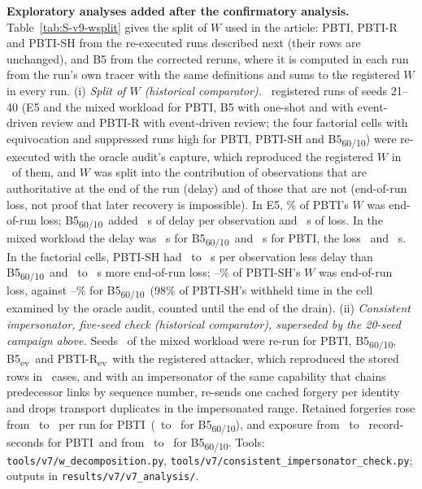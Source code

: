 \documentclass[10pt,a4paper]{article}
\newcommand{\sys}{PBTI}
\newcommand{\Bhist}{B5\textsubscript{60/10}}
\newcommand{\Bev}{B5\textsubscript{ev}}
\newcommand{\Rev}{PBTI-R\textsubscript{ev}}
\begin{document}
\noindent\textbf{Exploratory analyses added after the confirmatory analysis.} Table~\ref{tab:S-v9-wsplit} gives the split of $W$ used in the article: \sys, PBTI-R and PBTI-SH from the re-executed runs described next (their rows are unchanged), and B5 from the corrected reruns, where it is computed in each run from the run's own tracer with the same definitions and sums to the registered $W$ in every run. (i) \emph{Split of $W$ (historical comparator).} \XWdRuns\ registered runs of seeds 21--40 (E5 and the mixed workload for \sys, B5 with one-shot and with event-driven review and PBTI-R with event-driven review; the four factorial cells with equivocation and suppressed runs high for \sys, PBTI-SH and \Bhist) were re-executed with the oracle audit's capture, which reproduced the registered $W$ in \XWdAllMatch\ of them, and $W$ was split into the contribution of observations that are authoritative at the end of the run (delay) and of those that are not (end-of-run loss, not proof that later recovery is impossible). In E5, \XWdEfivePBTILossPct\% of \sys's $W$ was end-of-run loss; \Bhist\ added \XWdEfiveBhistDelayDiff~s of delay per observation and \XWdEfiveBhistLossDiff~s of loss. In the mixed workload the delay was \XWdMixedBhistDelay~s for \Bhist\ and \XWdMixedPBTIDelay~s for \sys, the loss \XWdMixedBhistLoss\ and \XWdMixedPBTILoss~s. In the factorial cells, PBTI-SH had \XWdFGSHvsBhistDelayMin\ to \XWdFGSHvsBhistDelayMax~s per observation less delay than \Bhist\ and \XWdFGSHvsBhistLossMin\ to \XWdFGSHvsBhistLossMax~s more end-of-run loss; \XWdFGSHLossPctMin--\XWdFGSHLossPctMax\% of PBTI-SH's $W$ was end-of-run loss, against \XWdFGBhistLossPctMin--\XWdFGBhistLossPctMax\% for \Bhist\ (98\% of PBTI-SH's withheld time in the cell examined by the oracle audit, counted until the end of the drain). (ii) \emph{Consistent impersonator, five-seed check (historical comparator), superseded by the 20-seed campaign above.} Seeds \XCiSeeds\ of the mixed workload were re-run for \sys, \Bhist, \Bev\ and \Rev\ with the registered attacker, which reproduced the stored rows in \XCiRegMatch\ cases, and with an impersonator of the same capability that chains predecessor links by sequence number, re-sends one cached forgery per identity and drops transport duplicates in the impersonated range. Retained forgeries rose from \XCiRegPBTIOOne\ to \XCiConPBTIOOne\ per run for \sys\ (\XCiRegBhistOOne\ to \XCiConBhistOOne\ for \Bhist), and exposure from \XCiRegPBTINLX\ to \XCiConPBTINLX\ record-seconds for \sys\ and from \XCiRegBhistNLX\ to \XCiConBhistNLX\ for \Bhist. Tools: \texttt{tools/\allowbreak{}v7/\allowbreak{}w\_\allowbreak{}decomposition.py}, \texttt{tools/\allowbreak{}v7/\allowbreak{}consistent\_\allowbreak{}impersonator\_\allowbreak{}check.py}; outputs in \texttt{results/\allowbreak{}v7/\allowbreak{}v7\_\allowbreak{}analysis/}.
\end{document}
